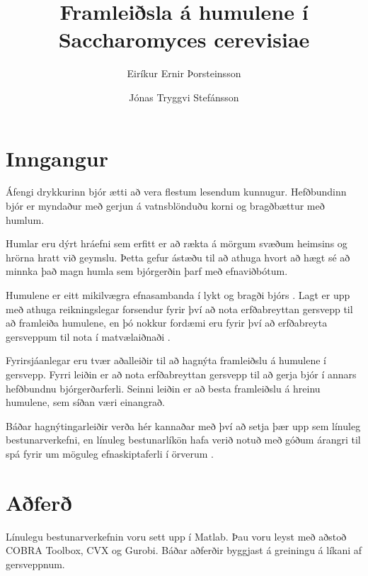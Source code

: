 \documentclass[11pt]{article}
\title{Framleiðsla á humulene í Saccharomyces cerevisiae}
\author{Eiríkur Ernir Þorsteinsson \and Jónas Tryggvi Stefánsson}
\date{}
\begin{document}
\maketitle

\setlength{\columnsep}{1cm}

\begin{abstract}
\lipsum[150]
\end{abstract}

\vspace{1cm}
\begin{multicols}{2}

\section{Inngangur}
Áfengi drykkurinn bjór ætti að vera flestum lesendum kunnugur. Hefðbundinn bjór er myndaður með gerjun á vatnsblönduðu korni og bragðbættur með humlum.

Humlar eru dýrt hráefni sem erfitt er að rækta á mörgum svæðum heimsins og hrörna hratt við geymslu. Þetta gefur ástæðu til að athuga hvort að hægt sé að minnka það magn humla sem bjórgerðin þarf með efnaviðbótum.

Humulene\cite[KEGG: C09684]{Kanehisa01012000} er eitt mikilvægra efnasambanda í lykt og bragði bjórs \cite{howard1957evaluation}. Lagt er upp með athuga reikningslegar forsendur fyrir því að nota erfðabreyttan gersvepp til að framleiða humulene, en þó nokkur fordæmi eru fyrir því að erfðabreyta gersveppum til nota í matvælaiðnaði \cite{dequin2001potential}.

Fyrirsjáanlegar eru tvær aðalleiðir til að hagnýta framleiðslu á humulene í gersvepp. Fyrri leiðin er að nota erfðabreyttan gersvepp til að gerja bjór í annars hefðbundnu bjórgerðarferli. Seinni leiðin er að besta framleiðslu á hreinu humulene, sem síðan væri einangrað.

Báðar hagnýtingarleiðir verða hér kannaðar með því að setja þær upp sem línuleg bestunarverkefni, en línuleg bestunarlíkön hafa verið notuð með góðum árangri til spá fyrir um möguleg efnaskiptaferli í örverum \cite{banga2008optimization,edwards2001silico}.
\section{Aðferð}
Línulegu bestunarverkefnin voru sett upp í Matlab. Þau voru leyst með aðstoð COBRA Toolbox, CVX og Gurobi.
Báðar aðferðir byggjast á greiningu á líkani af gersveppnum.

\end{multicols}
\end{document}
